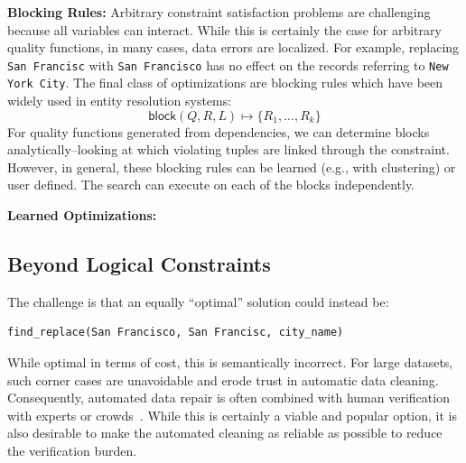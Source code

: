 \vspace{0.5em}\noindent\textbf{Blocking Rules: }  Arbitrary constraint satisfaction problems are challenging because all variables can interact. While this is certainly the case for arbitrary quality functions, in many cases, data errors are localized. For example, replacing \texttt{San Francisc} with \texttt{San Francisco} has no effect on the records referring to \texttt{New York City}. The final class of optimizations are blocking rules which have been widely used in entity resolution systems:
\[\textsf{block}(Q, R, L) \mapsto \{R_1,...,R_k\} \]
For quality functions generated from dependencies, we can determine blocks analytically--looking at which violating tuples are linked through the constraint.
However, in general, these blocking rules can be learned (e.g., with clustering) or user defined.
The search can execute on each of the blocks independently.

\vspace{0.5em}\noindent\textbf{Learned Optimizations: }


\subsection{Beyond Logical Constraints}
The challenge is that an equally ``optimal'' solution could instead be:
\begin{lstlisting}
find_replace(San Francisco, San Francisc, city_name)
\end{lstlisting}
While optimal in terms of cost, this is semantically incorrect. For large datasets, such corner cases are unavoidable and erode trust in automatic data cleaning.
Consequently, automated data repair is often combined with human verification with experts or crowds~\cite{gokhale2014corleone, park2014crowdfill, DBLP:journals/pvldb/YakoutENOI11, chu2015katara, DBLP:journals/pvldb/HaasKWF015,marcus2015crowdsourced}.
While this is certainly a viable and popular option, it is also desirable to make the automated cleaning as reliable as possible to reduce the verification burden.


